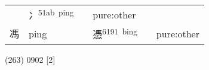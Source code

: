 \documentclass[14pt,a4paper]{scrartcl}
\begin{document}
\begin{longtable}[c]{@{}llllll@{}}
\begin{minipage}[t]{0.14\columnwidth}
\strut\end{minipage} &
\begin{minipage}[t]{0.14\columnwidth}\raggedright\strut
冫\textsuperscript{51ab~ping}
\strut\end{minipage} &
\begin{minipage}[t]{0.14\columnwidth}\raggedright\strut
\strut\end{minipage} &
\begin{minipage}[t]{0.14\columnwidth}\raggedright\strut
pure:other
\strut\end{minipage}\tabularnewline
\begin{minipage}[t]{0.14\columnwidth}\raggedright\strut
馮
\strut\end{minipage} &
\begin{minipage}[t]{0.14\columnwidth}\raggedright\strut
ping
\strut\end{minipage} &
\begin{minipage}[t]{0.14\columnwidth}\raggedright\strut
\strut\end{minipage} &
\begin{minipage}[t]{0.14\columnwidth}\raggedright\strut
憑\textsuperscript{6191~bing}
\strut\end{minipage} &
\begin{minipage}[t]{0.14\columnwidth}\raggedright\strut
\strut\end{minipage} &
\begin{minipage}[t]{0.14\columnwidth}\raggedright\strut
pure:other
\strut\end{minipage}\tabularnewline
\bottomrule
\end{longtable}

(263) 0902 {[}2{]}
\end{document}
